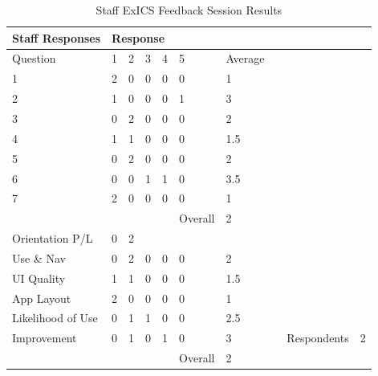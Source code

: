 \begin{table}[h]
\centering
\begin{tabular}{|l|l|l|l|l|l|l|l|ll|}
\hline
Staff Responses   & \multicolumn{9}{l}{Response}                     \\
\hline
Question          & 1 & 2 & 3 & 4 & 5 & Average &  &             &   \\
\hline
1                 & 2 & 0 & 0 & 0 & 0 & 1       &  &             &   \\
2                 & 1 & 0 & 0 & 0 & 1 & 3       &  &             &   \\
3                 & 0 & 2 & 0 & 0 & 0 & 2       &  &             &   \\
4                 & 1 & 1 & 0 & 0 & 0 & 1.5     &  &             &   \\
5                 & 0 & 2 & 0 & 0 & 0 & 2       &  &             &   \\
6                 & 0 & 0 & 1 & 1 & 0 & 3.5     &  &             &   \\
7                 & 2 & 0 & 0 & 0 & 0 & 1       &  &             &   \\
\hline
                  &   &   &   &   & Overall  & 2 &  &             &   \\
\hline
Orientation P/L   & 0 & 2 &   &   &   &         &  &             &   \\
Use \& Nav        & 0 & 2 & 0 & 0 & 0 & 2       &  &             &   \\
UI Quality        & 1 & 1 & 0 & 0 & 0 & 1.5     &  &             &   \\
App Layout        & 2 & 0 & 0 & 0 & 0 & 1       &  &             &   \\
Likelihood of Use & 0 & 1 & 1 & 0 & 0 & 2.5     &  &             &   \\
Improvement       & 0 & 1 & 0 & 1 & 0 & 3       &  & Respondents & 2 \\
\hline
                  &   &   &   &   & Overall  & 2 &  &             &   \\
\hline
\end{tabular}
\caption{Staff ExICS Feedback Session Results}
\label{tab:staff_results}
\end{table}

\FloatBarrier

